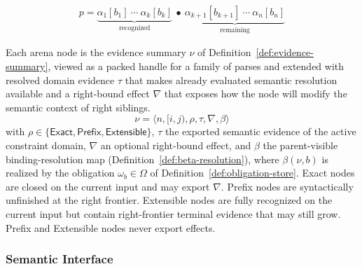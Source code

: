 \[
\begin{array}{c}
p =
\underbrace{\alpha_1[b_1]\ \cdots\ \alpha_k[b_k]}_{\text{recognized}}
\ \bullet\
\underbrace{\alpha_{k+1}[b_{k+1}]\ \cdots\ \alpha_n[b_n]}_{\text{remaining}}
\end{array}
\]


Each arena node is the evidence summary $\nu$ of Definition~\ref{def:evidence-summary}, viewed as a packed handle for a family of parses and extended with resolved domain evidence $\tau$ that makes already evaluated semantic resolution available and a right-bound effect $\nabla$ that exposes how the node will modify the semantic context of right siblings.
\[
\nu=\langle n,[i,j),\rho,\tau,\nabla,\beta \rangle
\]
with $\rho \in \{\mathsf{Exact},\mathsf{Prefix},\mathsf{Extensible}\}$, $\tau$ the exported semantic evidence of the active constraint domain, $\nabla$ an optional right-bound effect, and $\beta$ the parent-visible binding-resolution map (Definition~\ref{def:beta-resolution}), where $\beta(\nu,b)$ is realized by the obligation $\omega_b \in \Omega$ of Definition~\ref{def:obligation-store}. Exact nodes are closed on the current input and may export $\nabla$. Prefix nodes are syntactically unfinished at the right frontier. Extensible nodes are fully recognized on the current input but contain right-frontier terminal evidence that may still grow. Prefix and Extensible nodes never export effects.



\subsubsection{Semantic Interface}


